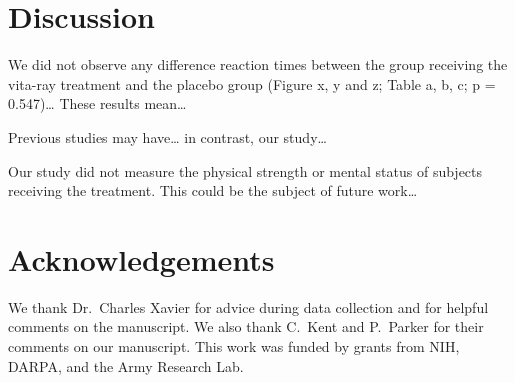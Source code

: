 \documentclass [twocolumn]{article}
\begin{document}
\section{Discussion}
We did not observe any difference reaction times between the group receiving the vita-ray treatment and the placebo group (Figure x, y and z; Table a, b, c; p = 0.547)… These results mean…

Previous studies may have… in contrast, our study… 

Our study did not measure the physical strength or mental status of subjects receiving the treatment.  This could be the subject of future work…


\section{Acknowledgements}
We thank Dr.~Charles Xavier for advice during data collection and for helpful comments on the manuscript.  We also thank C.~Kent and P.~Parker for their comments on our manuscript.  This work was funded by grants from NIH, DARPA, and the Army Research Lab.    


\end{document}
